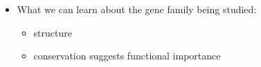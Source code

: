 \documentclass[landscape]{slides}
\begin{document}
\begin{slide}
\end{slide}
\begin{slide}


\small
\begin{itemize}
\item What we can learn about the gene family being studied:
\begin{itemize}
  \item structure
  \item conservation suggests functional importance 
\end{itemize}
\end{itemize}

\vfill
\end{slide}
\end{document}
